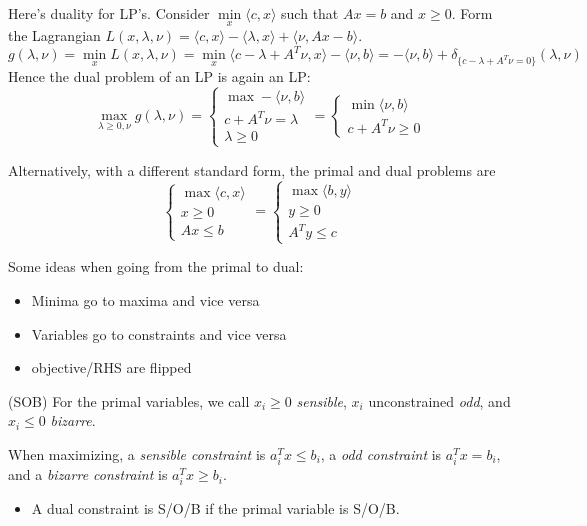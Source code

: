 \documentclass[english, 11pt]{article}
\begin{document}
\begin{exmp}
Here's duality for LP's. Consider $\min \limits_{x} \langle c, x \rangle $ such that $Ax=b$ and $x \ge 0$. Form the Lagrangian $L(x,\lambda,\nu) = \langle c,x \rangle - \langle \lambda,x \rangle + \langle \nu, Ax-b \rangle$. 
\[
g(\lambda,\nu) = \min \limits_x L(x,\lambda,\nu) =  \min \limits_x \langle c - \lambda + A^T \nu, x \rangle - \langle \nu,b \rangle
= - \langle \nu, b \rangle + \delta_{ \{ c - \lambda + A^T \nu = 0 \}}(\lambda,\nu)
\]
Hence the dual problem of an LP is again an LP:
\[
\max \limits_{\lambda \ge 0,   \nu}  g(\lambda,\nu)= \begin{cases}
\max - \langle \nu,b \rangle \\
c + A^T \nu = \lambda \\
\lambda \ge 0
\end{cases}
= \begin{cases}
\min  \langle \nu,b \rangle \\
c + A^T \nu  \ge 0
\end{cases}
\]

Alternatively, with a different standard form, the primal and dual problems are
\[
\begin{cases}
\max  \langle c,x \rangle \\
x \ge 0 \\
Ax \le b
\end{cases}
=
\begin{cases}
\max  \langle b,y \rangle \\
y \ge 0 \\
A^T y \le c
\end{cases}
\]
\end{exmp}

\begin{rem}
Some ideas when going from the primal to dual:
\begin{itemize}
\item Minima go to maxima and vice versa
\item Variables go to constraints and vice versa
\item objective/RHS are flipped
\end{itemize}

(SOB) For the primal variables, we call $x_i \ge 0$ {\it sensible}, $x_i$ unconstrained {\it odd}, and $x_i \le 0$ {\it bizarre}.

When maximizing, a {\it sensible constraint} is $a_i^T x \le b_i$, a {\it odd constraint} is $a_i^T x = b_i$, and a {\it bizarre constraint} is $a_i^T x \ge b_i$.
\begin{itemize}
\item A dual constraint is S/O/B if the primal variable is S/O/B.
\end{itemize}
\end{rem}
\end{document}
